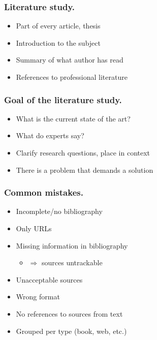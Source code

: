 \documentclass[aspectratio=169]{beamer}
\begin{document}
    \begin{frame}
        \frametitle{Literature study.}
        
        \begin{itemize}
            \item Part of every article, thesis
            \item Introduction to the subject
            \item Summary of what author has read
            \item References to professional literature
        \end{itemize}
        
    \end{frame}
    
    \begin{frame}
        \frametitle{Goal of the literature study.}
        
        \begin{itemize}
            \item What is the current state of the art?
            \item What do experts say?
            \item Clarify research questions, place in context
            \item There is a problem that demands a solution
        \end{itemize}
        
        \bigskip
        
    \end{frame}
    
    \begin{frame}
        \frametitle{Common mistakes.}
        
        \begin{itemize}
            \item Incomplete/no bibliography 
            \item Only URLs
            \item Missing information in bibliography
            \begin{itemize}
                \item \(\Rightarrow\) sources untrackable
            \end{itemize}
            \item Unacceptable sources 
            \item Wrong format
            \item No references to sources from text
            \item Grouped per type (book, web, etc.)
        \end{itemize}
    \end{frame}
    
\end{document}
